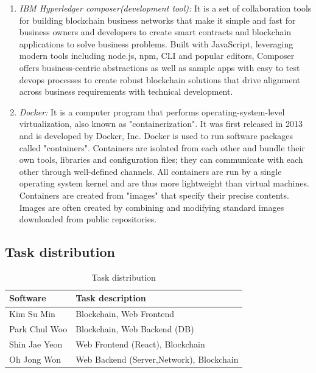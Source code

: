 \documentclass[conference]{IEEEtran}
\begin{document}
\begin{enumerate} [font=\itshape]
   \item \textit{IBM Hyperledger composer(development tool): }It is a set of collaboration tools for building blockchain business networks that make it simple and fast for business owners and developers to create smart contracts and blockchain applications to solve business problems. Built with JavaScript, leveraging modern tools including node.js, npm, CLI and popular editors, Composer offers business-centric abstractions as well as sample apps with easy to test devops processes to create robust blockchain solutions that drive alignment across business requirements with technical development.\\
   \item \textit{Docker: }It is a computer program that performs operating-system-level virtualization, also known as "containerization". It was first released in 2013 and is developed by Docker, Inc. Docker is used to run software packages called "containers". Containers are isolated from each other and bundle their own tools, libraries and configuration files; they can communicate with each other through well-defined channels. All containers are run by a single operating system kernel and are thus more lightweight than virtual machines. Containers are created from "images" that specify their precise contents. Images are often created by combining and modifying standard images downloaded from public repositories.\\

\end{enumerate}

\subsection{Task distribution}
  \begin{table}[htbp]
  \renewcommand{\arraystretch}{1.7}
\caption{Task distribution}
\begin{center}
\begin{tabular}{|p{1.8cm}|p{6.1cm}|}
\hline
\textbf{Software} & \textbf{Task description} \\
\hline
Kim Su Min & Blockchain, Web Frontend\\
\hline
Park Chul Woo & Blockchain, Web Backend (DB)\\
\hline
Shin Jae Yeon& Web Frontend (React), Blockchain\\
\hline
Oh Jong Won  & Web Backend (Server,Network), Blockchain\\
\hline
\end{tabular}
\label{tab1}
\end{center}
\end{table}
\end{document}
